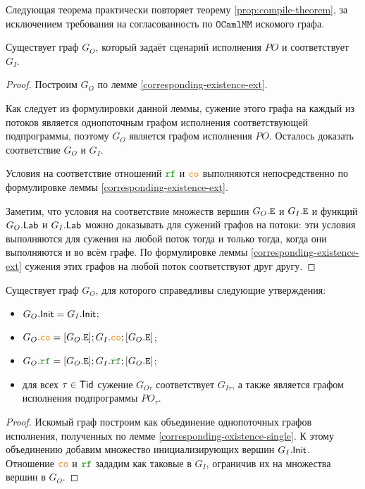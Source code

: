 \documentclass[14pt]{matmex-diploma-custom}
\newcommand{\OMM}{\mathtt{OCaml}\allowbreak \mathtt{MM}}
\begin{document}
Следующая теорема практически повторяет теорему \ref{prop:compile-theorem}, за исключением требования на согласованность по $\OMM$ искомого графа. 

\begin{theorem} \label{corresponding-existence}
  Существует граф $G_O$, который задаёт сценарий исполнения $PO$ и соответствует $G_I$. 
\end{theorem}
\begin{proof}
  Построим $G_O$ по лемме \ref{corresponding-existence-ext}. 
  
  Как следует из формулировки данной леммы, сужение этого графа на каждый из потоков является однопоточным графом исполнения соответствующей подпрограммы, поэтому $G_O$ является графом исполнения $PO$. Осталось доказать соответствие $G_O$ и $G_I$. 

  Условия на соответствие отношений $\lRF$ и $\lCO$ выполняются непосредственно по формулировке леммы \ref{corresponding-existence-ext}.

  Заметим, что условия на соответствие множеств вершин $G_O.{\mathtt{E}}$ и $G_I.{\mathtt{E}}$ и функций $G_O.\mathsf{Lab}$ и $G_I.\mathsf{Lab}$ можно доказывать для сужений графов на потоки:  эти условия выполняются для сужения на любой поток тогда и только тогда, когда они выполняются и во всём графе. По формулировке леммы \ref{corresponding-existence-ext} сужения этих графов на любой поток соответствуют друг другу. 
\end{proof}

\begin{lemma} \label{corresponding-existence-ext}
  Существует граф $G_O$, для которого справедливы следующие утверждения:
  \begin{itemize}
  \item $G_O.\mathsf{Init}=G_I.\mathsf{Init}$;
  \item $G_O.\lCO = [G_O.\lE]; G_I.\lCO; [G_O.\lE]$;
  \item $G_O.\lRF = [G_O.\lE]; G_I.\lRF; [G_O.\lE]$;
  \item для всех $\tau \in \mathsf{Tid}$ сужение $G_{O\tau}$ соответствует $G_{I\tau}$, а также является графом исполнения подпрограммы $PO_\tau$. 
  \end{itemize}
\end{lemma}
\begin{proof}
  Искомый граф построим как объединение однопоточных графов исполнения, полученных по лемме \ref{corresponding-existence-single}. К этому объединению добавим множество инициализирующих вершин $G_I.\mathsf{Init}$. Отношение $\lCO$ и $\lRF$ зададим как таковые в $G_I$, ограничив их на множества вершин в $G_O$. 
\end{proof}
\end{document}
